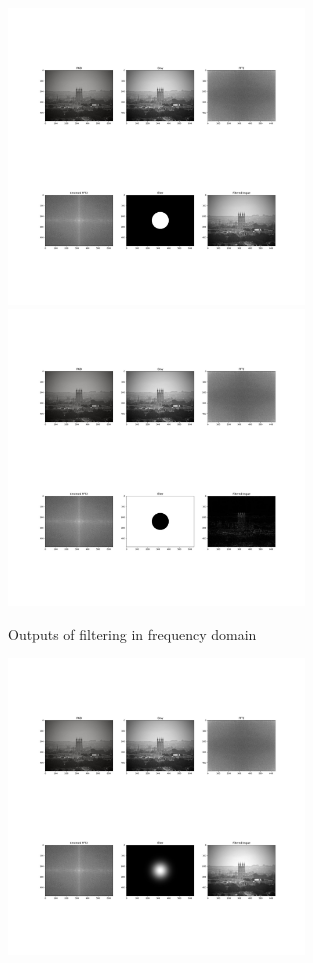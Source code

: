 \documentclass{article}
\begin{document}
{{        \begin{figure}[htp]
            \centering
            \includegraphics[width=0.7\textwidth]{Assignment-11/fig-v31.jpg}
            \includegraphics[width=0.7\textwidth]{Assignment-11/fig-v32.jpg}
            \caption{Outputs of filtering in frequency domain}
        \end{figure}
        \begin{figure}[htp]
            \centering
            \includegraphics[width=0.7\textwidth]{Assignment-11/fig-v33.jpg}

\end{figure}}}
\end{document}
